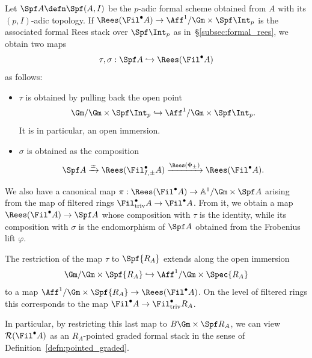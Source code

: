 \documentclass[10pt]{amsart}
\begin{document}
\begin{definition}
Let $\Spf A \defn \Spf(A,I)$ be the $p$-adic formal scheme obtained from $A$ with its $(p,I)$-adic topology. If $\Rees(\Fil^\bullet A)\to \Aff^1/\Gm\times \Spf\Int_p$ is the associated formal Rees stack over $\Spf\Int_p$ as in~\S\ref{subsec:formal_rees}, we obtain two maps
\[
\tau,\sigma:\Spf A \hookrightarrow \Rees(\Fil^\bullet A)
\]
as follows:
\begin{itemize}
   \item $\tau$ is obtained by pulling back the open point
   \[
    \Gm/\Gm\times \Spf \Int_p\hookrightarrow \Aff^1/\Gm\times \Spf\Int_p.
   \]
   It is in particular, an open immersion.
   \item $\sigma$ is obtained as the composition
   \[
   \Spf A \xrightarrow{\simeq} \Rees(\Fil^\bullet_{I,\pm}A) \xrightarrow{\Rees(\Phi_{\pm})} \Rees(\Fil^\bullet A).
   \]
\end{itemize}
\end{definition}


\begin{remark}
\label{rem:abstract_structure_map}
We also have a canonical map $\pi:\Rees(\Fil^\bullet A)\to \mathbb{A}^1/\Gm\times \Spf A$ arising from the map of filtered rings $\Fil^\bullet_{\mathrm{triv}}A\to \Fil^\bullet A$. From it, we obtain a map $\Rees(\Fil^\bullet A)\to \Spf A$ whose composition with $\tau$ is the identity, while its composition with $\sigma$ is the endomorphism of $\Spf A$ obtained from the Frobenius lift $\varphi$.
\end{remark}


\begin{remark}
\label{rem:abstract_de_rham_point}
The restriction of the map $\tau$ to $\Spf{R_A}$ extends along the open immersion
\[
\Gm/\Gm\times\Spf {R_A}\hookrightarrow \Aff^1/\Gm\times \Spec {R_A}
\]
to a map $\Aff^1/\Gm\times\Spf {R_A}\to \Rees(\Fil^\bullet A)$. On the level of filtered rings this corresponds to the map $\Fil^\bullet A\to \Fil^\bullet_{\mathrm{triv}}{R_A}$. 

In particular, by restricting this last map to $B\Gm\times \Spf R_A$, we can view $\mathcal{R}(\Fil^\bullet A)$ as an $R_A$-pointed graded formal stack in the sense of Definition~\ref{defn:pointed_graded}.
\end{remark}
\end{document}
